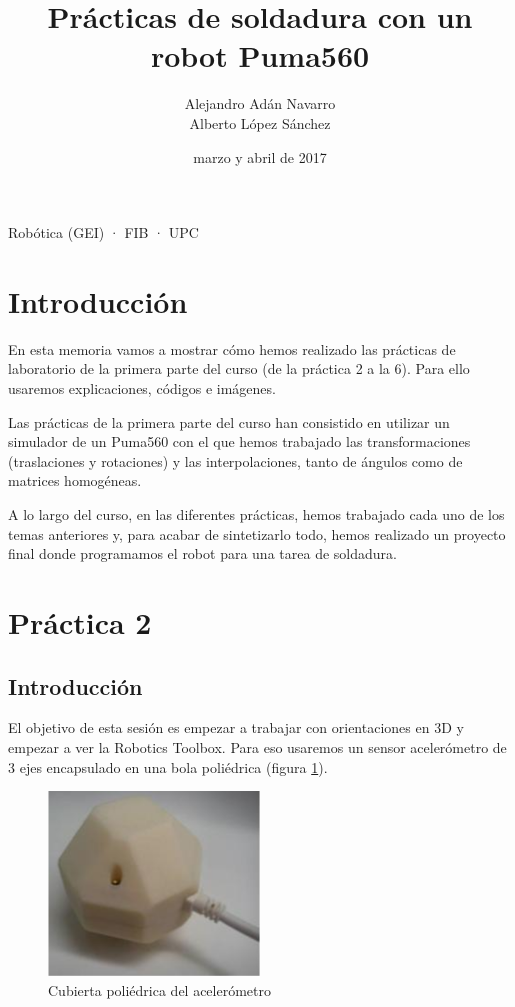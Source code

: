 \documentclass{article}
\let\oldsection\section
\renewcommand\section{\clearpage\oldsection}
\newcommand{\fref}[1]{figura \ref{fig:#1}}
\begin{document}
\title{Prácticas de soldadura con un robot Puma560}
\author{Alejandro Adán Navarro \\ Alberto López Sánchez}
\date{marzo y abril de 2017}

\maketitle
\begin{center}
Robótica (GEI) · FIB · UPC
\end{center}
\clearpage
\tableofcontents
\clearpage
\listoffigures

\section{Introducción}

En esta memoria vamos a mostrar cómo hemos realizado las prácticas de laboratorio de la primera parte del curso (de la práctica 2 a la 6). Para ello usaremos explicaciones, códigos e imágenes.


Las prácticas de la primera parte del curso han consistido en utilizar un simulador de un Puma560 con el que hemos trabajado las transformaciones (traslaciones y rotaciones) y las interpolaciones, tanto de ángulos como de matrices homogéneas. 


A lo largo del curso, en las diferentes prácticas, hemos trabajado cada uno de los temas anteriores y, para acabar de sintetizarlo todo, hemos realizado un proyecto final donde programamos el robot para una tarea de soldadura.

\section{Práctica 2}
\subsection{Introducción}

El objetivo de esta sesión es empezar a trabajar con
orientaciones en 3D y empezar a ver la Robotics Toolbox. Para eso usaremos un sensor acelerómetro de 3 ejes encapsulado en una bola poliédrica (\fref{imagen_bola}).

\begin{figure}[h]
\centering
\includegraphics[width=0.5\textwidth]{bola.PNG}
\caption{Cubierta poliédrica del acelerómetro}
\label{fig:imagen_bola}
\end{figure}
\end{document}
